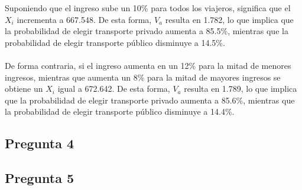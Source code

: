 Suponiendo que el ingreso sube un 10\% para todos los viajeros, significa que el $X_i$ incrementa a 667.548. De esta forma, $V_a$ resulta en 1.782, lo que implica que la probabilidad de elegir transporte privado aumenta a 85.5\%, mientras que la probabilidad de elegir transporte público disminuye a 14.5\%.
\\ \\
De forma contraria, si el ingreso aumenta en un 12\% para la mitad de menores ingresos, mientras que aumenta un 8\% para la mitad de mayores ingresos se obtiene un $X_i$ igual a 672.642. De esta forma, $V_a$ resulta en 1.789, lo que implica que la probabilidad de elegir transporte privado aumenta a 85.6\%, mientras que la probabilidad de elegir transporte público disminuye a 14.4\%.

\subsection{Pregunta 4}


\subsection{Pregunta 5}

